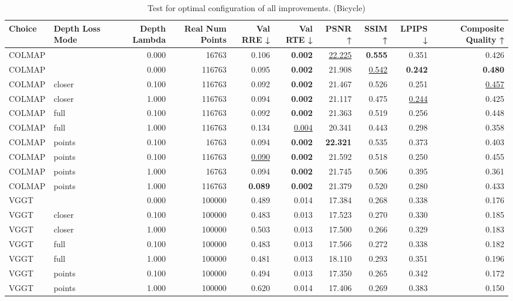 \begin{table}[H]
\caption{Test for optimal configuration of all improvements. (Bicycle)}
\label{tab:99_all_improvements_bicycle}
\small
\begin{tabular}{llrrrrrrrr}
\toprule
Choice & Depth Loss Mode & Depth Lambda & Real Num Points & Val RRE ↓ & Val RTE ↓ & PSNR ↑ & SSIM ↑ & LPIPS ↓ & Composite Quality ↑ \\
\midrule
COLMAP &  & 0.000 & 16763 & 0.106 & \textbf{0.002} & \underline{22.225} & \textbf{0.555} & 0.351 & 0.426 \\
COLMAP &  & 0.000 & 116763 & 0.095 & \textbf{0.002} & 21.908 & \underline{0.542} & \textbf{0.242} & \textbf{0.480} \\
COLMAP & closer & 0.100 & 116763 & 0.092 & \textbf{0.002} & 21.467 & 0.526 & 0.251 & \underline{0.457} \\
COLMAP & closer & 1.000 & 116763 & 0.094 & \textbf{0.002} & 21.117 & 0.475 & \underline{0.244} & 0.425 \\
COLMAP & full & 0.100 & 116763 & 0.092 & \textbf{0.002} & 21.363 & 0.519 & 0.256 & 0.448 \\
COLMAP & full & 1.000 & 116763 & 0.134 & \underline{0.004} & 20.341 & 0.443 & 0.298 & 0.358 \\
COLMAP & points & 0.100 & 16763 & 0.094 & \textbf{0.002} & \textbf{22.321} & 0.535 & 0.373 & 0.403 \\
COLMAP & points & 0.100 & 116763 & \underline{0.090} & \textbf{0.002} & 21.592 & 0.518 & 0.250 & 0.455 \\
COLMAP & points & 1.000 & 16763 & 0.094 & \textbf{0.002} & 21.745 & 0.506 & 0.395 & 0.361 \\
COLMAP & points & 1.000 & 116763 & \textbf{0.089} & \textbf{0.002} & 21.379 & 0.520 & 0.280 & 0.433 \\
VGGT &  & 0.000 & 100000 & 0.489 & 0.014 & 17.384 & 0.268 & 0.338 & 0.176 \\
VGGT & closer & 0.100 & 100000 & 0.483 & 0.013 & 17.523 & 0.270 & 0.330 & 0.185 \\
VGGT & closer & 1.000 & 100000 & 0.503 & 0.013 & 17.500 & 0.266 & 0.329 & 0.183 \\
VGGT & full & 0.100 & 100000 & 0.483 & 0.013 & 17.566 & 0.272 & 0.338 & 0.182 \\
VGGT & full & 1.000 & 100000 & 0.481 & 0.013 & 18.110 & 0.293 & 0.351 & 0.196 \\
VGGT & points & 0.100 & 100000 & 0.494 & 0.013 & 17.350 & 0.265 & 0.342 & 0.172 \\
VGGT & points & 1.000 & 100000 & 0.620 & 0.014 & 17.406 & 0.269 & 0.383 & 0.150 \\
\bottomrule
\end{tabular}
\end{table}
